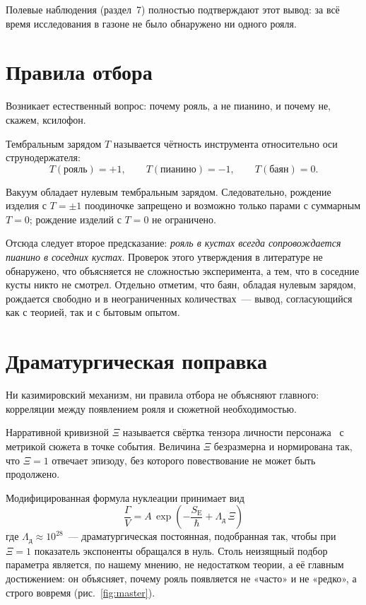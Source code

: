 \documentclass[11pt,a4paper]{article}
\newcommand{\Lnar}{\Lambda_{\text{д}}}
\begin{document}
Полевые наблюдения (раздел~7) полностью подтверждают этот вывод: за всё время исследования в газоне не было обнаружено ни одного рояля.

\section{Правила отбора}

Возникает естественный вопрос: почему рояль, а не пианино, и почему не, скажем, ксилофон.

\begin{definition}
Тембральным зарядом $T$ называется чётность инструмента относительно оси струнодержателя:
\[
T(\text{рояль}) = +1, \qquad T(\text{пианино}) = -1, \qquad T(\text{баян}) = 0.
\]
\end{definition}

\begin{theorem}
Вакуум обладает нулевым тембральным зарядом. Следовательно, рождение изделия с $T=\pm1$ поодиночке запрещено и возможно только парами с суммарным $T=0$; рождение изделий с $T=0$ не ограничено.
\end{theorem}

Отсюда следует второе предсказание: \emph{рояль в кустах всегда сопровождается пианино в соседних кустах}. Проверок этого утверждения в литературе не обнаружено, что объясняется не сложностью эксперимента, а тем, что в соседние кусты никто не смотрел. Отдельно отметим, что баян, обладая нулевым зарядом, рождается свободно и в неограниченных количествах~--- вывод, согласующийся как с теорией, так и с бытовым опытом.

\section{Драматургическая поправка}

Ни казимировский механизм, ни правила отбора не объясняют главного: корреляции между появлением рояля и сюжетной необходимостью.

\begin{definition}
Нарративной кривизной $\Xi$ называется свёртка тензора личности персонажа~\cite{tenzor} с метрикой сюжета в точке события. Величина $\Xi$ безразмерна и нормирована так, что $\Xi = 1$ отвечает эпизоду, без которого повествование не может быть продолжено.
\end{definition}

Модифицированная формула нуклеации принимает вид
\begin{equation}
\boxed{\;\frac{\Gamma}{V} = A\,\exp\!\left(-\frac{S_{\mathrm{E}}}{\hbar} + \Lnar\,\Xi\right)\;}
\label{eq:master}
\end{equation}
где $\Lnar \approx 10^{28}$~--- драматургическая постоянная, подобранная так, чтобы при $\Xi = 1$ показатель экспоненты обращался в нуль. Столь неизящный подбор параметра является, по нашему мнению, не недостатком теории, а её главным достижением: он объясняет, почему рояль появляется не «часто» и не «редко», а строго вовремя (рис.~\ref{fig:master}).
\end{document}
